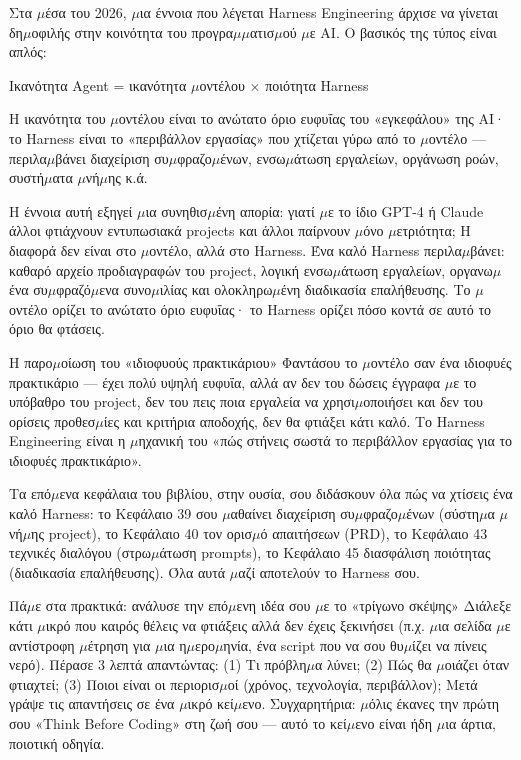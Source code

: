 
Στα $\mu$έσα του 2026, $\mu$ια έννοια που λέγεται Harness Engineering άρχισε να γίνεται δη$\mu$οφιλής στην κοινότητα του προγρα$\mu$$\mu$ατισ$\mu$ού $\mu$ε AI. Ο βασικός της τύπος είναι απλός:

Ικανότητα Agent = ικανότητα $\mu$οντέλου × ποιότητα Harness

Η ικανότητα του $\mu$οντέλου είναι το ανώτατο όριο ευφυΐας του «εγκεφάλου» της AI· το Harness είναι το «περιβάλλον εργασίας» που χτίζεται γύρω από το $\mu$οντέλο — περιλα$\mu$βάνει διαχείριση συ$\mu$φραζο$\mu$ένων, ενσω$\mu$άτωση εργαλείων, οργάνωση ροών, συστή$\mu$ατα $\mu$νή$\mu$ης κ.ά.

Η έννοια αυτή εξηγεί $\mu$ια συνηθισ$\mu$ένη απορία: γιατί $\mu$ε το ίδιο GPT-4 ή Claude άλλοι φτιάχνουν εντυπωσιακά projects και άλλοι παίρνουν $\mu$όνο $\mu$ετριότητα; Η διαφορά δεν είναι στο $\mu$οντέλο, αλλά στο Harness. Ένα καλό Harness περιλα$\mu$βάνει: καθαρό αρχείο προδιαγραφών του project, λογική ενσω$\mu$άτωση εργαλείων, οργανω$\mu$ένα συ$\mu$φραζό$\mu$ενα συνο$\mu$ιλίας και ολοκληρω$\mu$ένη διαδικασία επαλήθευσης. Το $\mu$οντέλο ορίζει το ανώτατο όριο ευφυΐας· το Harness ορίζει πόσο κοντά σε αυτό το όριο θα φτάσεις.

\begin{tcbinfo}{Η παρο$\mu$οίωση του «ιδιοφυούς πρακτικάριου»}
Φαντάσου το $\mu$οντέλο σαν ένα ιδιοφυές πρακτικάριο — έχει πολύ υψηλή ευφυΐα, αλλά αν δεν του δώσεις έγγραφα $\mu$ε το υπόβαθρο του project, δεν του πεις ποια εργαλεία να χρησι$\mu$οποιήσει και δεν του ορίσεις προθεσ$\mu$ίες και κριτήρια αποδοχής, δεν θα φτιάξει κάτι καλό. Το Harness Engineering είναι η $\mu$ηχανική του «πώς στήνεις σωστά το περιβάλλον εργασίας για το ιδιοφυές πρακτικάριο».

\end{tcbinfo}

Τα επό$\mu$ενα κεφάλαια του βιβλίου, στην ουσία, σου διδάσκουν όλα πώς να χτίσεις ένα καλό Harness: το Κεφάλαιο 39 σου $\mu$αθαίνει διαχείριση συ$\mu$φραζο$\mu$ένων (σύστη$\mu$α $\mu$νή$\mu$ης project), το Κεφάλαιο 40 τον ορισ$\mu$ό απαιτήσεων (PRD), το Κεφάλαιο 43 τεχνικές διαλόγου (στρω$\mu$άτωση prompts), το Κεφάλαιο 45 διασφάλιση ποιότητας (διαδικασία επαλήθευσης). Όλα αυτά $\mu$αζί αποτελούν το Harness σου.

\begin{tcbpractice}{Πά$\mu$ε στα πρακτικά: ανάλυσε την επό$\mu$ενη ιδέα σου $\mu$ε το «τρίγωνο σκέψης»}
Διάλεξε κάτι $\mu$ικρό που καιρός θέλεις να φτιάξεις αλλά δεν έχεις ξεκινήσει (π.χ. $\mu$ια σελίδα $\mu$ε αντίστροφη $\mu$έτρηση για $\mu$ια η$\mu$ερο$\mu$ηνία, ένα script που να σου θυ$\mu$ίζει να πίνεις νερό). Πέρασε 3 λεπτά απαντώντας: (1) Τι πρόβλη$\mu$α λύνει; (2) Πώς θα $\mu$οιάζει όταν φτιαχτεί; (3) Ποιοι είναι οι περιορισ$\mu$οί (χρόνος, τεχνολογία, περιβάλλον); Μετά γράψε τις απαντήσεις σε ένα $\mu$ικρό κεί$\mu$ενο. Συγχαρητήρια: $\mu$όλις έκανες την πρώτη σου «Think Before Coding» στη ζωή σου — αυτό το κεί$\mu$ενο είναι ήδη $\mu$ια άρτια, ποιοτική οδηγία.

\end{tcbpractice}

